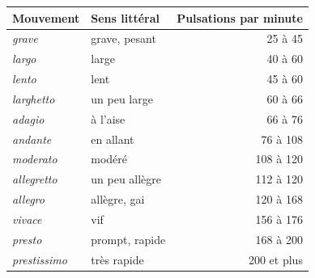 \begin{tabular}{@{}l l r@{}}
\toprule
\textbf{Mouvement} & \textbf{Sens littéral} & \textbf{Pulsations par minute} \\
\midrule
\emph{grave} & grave, pesant & 25 à 45 \\
\emph{largo} & large & 40 à 60 \\
\emph{lento} & lent & 45 à 60 \\
\emph{larghetto} & un peu large & 60 à 66 \\
\emph{adagio} & à l'aise & 66 à 76 \\
\emph{andante} & en allant & 76 à 108 \\
\emph{moderato} & modéré & 108 à 120 \\
\emph{allegretto} & un peu allègre & 112 à 120 \\
\emph{allegro} & allègre, gai & 120 à 168 \\
\emph{vivace} & vif & 156 à 176 \\
\emph{presto} & prompt, rapide & 168 à 200 \\
\emph{prestissimo} & très rapide & 200 et plus \\
\bottomrule
\end{tabular}
